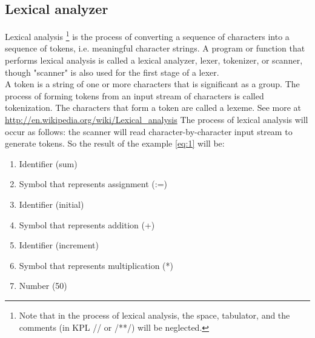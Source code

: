 \documentclass[12pt, a4paper]{report}
\begin{document}
			\subsection{Lexical analyzer}
				\tab Lexical analysis \footnote{Note that in the process of lexical analysis, the space, tabulator, and the comments (in KPL // or /**/) will be neglected.} is the process of converting a sequence of characters into a sequence of tokens, i.e. meaningful character strings. A program or function that performs lexical analysis is called a lexical analyzer, lexer, tokenizer, or scanner, though "scanner" is also used for the first stage of a lexer. \\
				\tab A token is a string of one or more characters that is significant as a group. The process of forming tokens from an input stream of characters is called tokenization. The characters that form a token are called a lexeme. 
				See more at \url{http://en.wikipedia.org/wiki/Lexical_analysis}
				\newline
				The process of lexical analysis will occur as follows: the scanner will read character-by-character input stream to generate tokens. So the result of the example \ref{eq:1} will be:
				\begin{enumerate}
					\item Identifier (sum)
					\item Symbol that represents assignment  (:=)
					\item Identifier (initial)
					\item Symbol that represents addition (+)
					\item Identifier (increment)
					\item Symbol that represents multiplication (*)
					\item Number (50)
				\end{enumerate}
\end{document}
